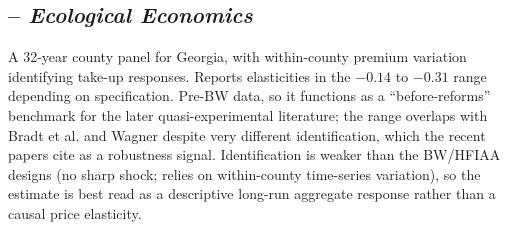 \documentclass[11pt]{article}
\begin{document}
\subsection*{\citet{atreya2015} -- \textit{Ecological Economics}}
A 32-year county panel for Georgia, with within-county premium variation
identifying take-up responses. Reports elasticities in the $-0.14$ to $-0.31$
range depending on specification. Pre-BW data, so it functions as a
``before-reforms'' benchmark for the later quasi-experimental literature; the
range overlaps with Bradt et al. and Wagner despite very different
identification, which the recent papers cite as a robustness signal.
Identification is weaker than the BW/HFIAA designs (no sharp shock; relies on
within-county time-series variation), so the estimate is best read as a
descriptive long-run aggregate response rather than a causal price elasticity.
\end{document}
